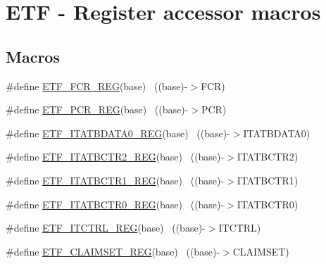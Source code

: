 \hypertarget{group___e_t_f___register___accessor___macros}{}\section{E\+TF -\/ Register accessor macros}
\label{group___e_t_f___register___accessor___macros}
\subsection*{Macros}
\begin{DoxyCompactItemize}
\item 
\#define \hyperlink{group___e_t_f___register___accessor___macros_ga3a6090c96a97fedec3eecc70692c9281}{E\+T\+F\+\_\+\+F\+C\+R\+\_\+\+R\+EG}(base)                                            ~((base)-\/$>$F\+CR)
\item 
\#define \hyperlink{group___e_t_f___register___accessor___macros_ga7f09a0cf0ce3ad36eaebb2ece85082bb}{E\+T\+F\+\_\+\+P\+C\+R\+\_\+\+R\+EG}(base)                                            ~((base)-\/$>$P\+CR)
\item 
\#define \hyperlink{group___e_t_f___register___accessor___macros_ga86a704f3527d5df411f99ec8f9676d3d}{E\+T\+F\+\_\+\+I\+T\+A\+T\+B\+D\+A\+T\+A0\+\_\+\+R\+EG}(base)                              ~((base)-\/$>$I\+T\+A\+T\+B\+D\+A\+T\+A0)
\item 
\#define \hyperlink{group___e_t_f___register___accessor___macros_gaa9b800e446803bbceb31252ffb731292}{E\+T\+F\+\_\+\+I\+T\+A\+T\+B\+C\+T\+R2\+\_\+\+R\+EG}(base)                                ~((base)-\/$>$I\+T\+A\+T\+B\+C\+T\+R2)
\item 
\#define \hyperlink{group___e_t_f___register___accessor___macros_ga44f6405ca9c25db97a240bd1aed17297}{E\+T\+F\+\_\+\+I\+T\+A\+T\+B\+C\+T\+R1\+\_\+\+R\+EG}(base)                                ~((base)-\/$>$I\+T\+A\+T\+B\+C\+T\+R1)
\item 
\#define \hyperlink{group___e_t_f___register___accessor___macros_ga6ebd31f02cbd86ae5ef2ed2df8ca432d}{E\+T\+F\+\_\+\+I\+T\+A\+T\+B\+C\+T\+R0\+\_\+\+R\+EG}(base)                                ~((base)-\/$>$I\+T\+A\+T\+B\+C\+T\+R0)
\item 
\#define \hyperlink{group___e_t_f___register___accessor___macros_ga918b6dc59d132cd28982b2db5a9da5e3}{E\+T\+F\+\_\+\+I\+T\+C\+T\+R\+L\+\_\+\+R\+EG}(base)                                      ~((base)-\/$>$I\+T\+C\+T\+RL)
\item 
\#define \hyperlink{group___e_t_f___register___accessor___macros_gaf42e2c82c7c3f8b0b92c0220651a307b}{E\+T\+F\+\_\+\+C\+L\+A\+I\+M\+S\+E\+T\+\_\+\+R\+EG}(base)                                  ~((base)-\/$>$C\+L\+A\+I\+M\+S\+ET)

\end{DoxyCompactItemize}
